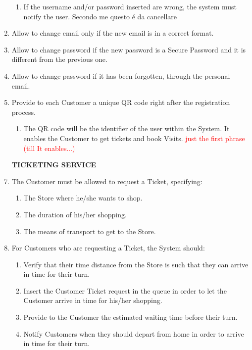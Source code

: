 \documentclass[a4paper, 10pt, oneside]{article}
\newcommand*{\lorenzo}[1]{\textcolor{BurntOrange}{#1}}
\newcommand{\yasmin}[1]{\textcolor{Red}{#1}}
\begin{document}
\begin{enumerate}[align=left]
\begin{enumerate}[label={-}]
        \item If the username and/or password inserted are wrong, the system must notify the user. \lorenzo{Secondo me questo é da cancellare}
    \end{enumerate}
    \item \label{req:changeMail} Allow to change email only if the new email is in a correct format.
    \item Allow to change password if the new password is a Secure Password and it is different from the previous one.
    \item \label{req:changePass}Allow to change password if it has been forgotten, through the personal email.
    \item \label{req:provideQR} Provide to each Customer a unique QR code \lorenzo{right after the registration process}.
    \begin{enumerate}[label={-}]
        \item \label{req:provideQR:uniqueID} \lorenzo{The QR code will be the identifier of the user within the System. It enables the Customer to get tickets and book Visits.} \yasmin{just the first phrase (till It enables...)}
    \end{enumerate}
    
    \item[\textbf{TICKETING SERVICE}]
    \item \label{req:requestTicket} The Customer must be allowed to request a Ticket, specifying:
     \begin{enumerate}[label={-}]
        \item \label{req:requestTicket:store} The Store where he/she wants to shop.
        \item \label{req:requestTicket:duration}The duration of his/her shopping.
        \item \label{req:requestTicket:transport}The means of transport to get to the Store.
    \end{enumerate}
    \item \label{req:systemTicket}For Customers who are requesting a Ticket, the System should:
    \begin{enumerate}[label={-}]
        \item \label{req:systemTicket:verifyDist} Verify that their time distance from the Store is such that they can arrive in time for their turn.
        \item \label{req:systemTicket:addInQueue}Insert the Customer Ticket request in the queue in order to let the Customer arrive in time for his/her shopping.
        \item \label{req:systemTicket:waitingTime} Provide to the Customer the estimated waiting time before their turn.
        \item \label{req:systemTicket:notifForDepart} Notify Customers when they should depart from home in order to arrive in time for their turn.
    \end{enumerate}
    

\end{enumerate}
\end{document}
